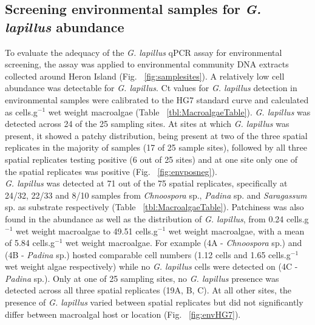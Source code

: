 \documentclass[10pt,letterpaper]{article}
\begin{document}
\subsection*{Screening environmental samples for \emph{G. lapillus} abundance }
\FloatBarrier
To evaluate the adequacy of the \emph{G. lapillus} 
qPCR assay for environmental screening, the assay was applied to environmental community DNA extracts collected around Heron Island (Fig. ~\ref{fig:samplesites}). 
A relatively low cell abundance was detectable for \emph{G. lapillus}. 
Ct values for \emph{G. lapillus} detection in environmental samples were calibrated to the HG7 standard curve and calculated as cells.g$^{-1}$ wet weight macroalgae (Table ~\ref{tbl:MacroalgaeTable}).  
\emph{G. lapillus} was detected across 24 of the 25 sampling sites. 
At sites at which \textit{G. lapillus} was present, it showed a patchy distribution, being present at two of the three spatial replicates in the majority of samples (17 of 25 sample sites), followed by all three spatial replicates testing positive (6 out of 25 sites) and at one site only one of the spatial replicates was positive (Fig. ~\ref{fig:envposneg}). \\
\emph{G. lapillus} was detected at 71 out of the 75 spatial replicates, specifically at 24/32, 22/33 and 8/10 samples from \emph{Chnoospora} sp., \emph{Padina} sp. and \emph{Saragassum} sp. as substrate respectively (Table ~\ref{tbl:MacroalgaeTable}).
Patchiness was also found in the abundance as well as the distribution of \emph{G. lapillus}, from 0.24 cells.g$^{-1}$ wet weight macroalgae to 49.51 cells.g$^{-1}$ wet weight macroalgae, with a mean of 5.84 cells.g$^{-1}$ wet weight macroalgae. 
For example (4A - \emph{Chnoospora} sp.) and (4B - \emph{Padina} sp.) hosted comparable cell numbers (1.12 cells and 1.65 cells.g$^{-1}$ wet weight algae respectively) while no \emph{G. lapillus} cells were detected on (4C - \emph{Padina} sp.).
Only at one of 25 sampling sites, no \emph{G. lapillus} presence was detected across all three spatial replicates (19A, B, C).
At all other sites, the presence of \textit{G. lapillus} varied between spatial replicates but did not significantly differ between macroalgal host or location (Fig. ~\ref{fig:envHG7}). 
\end{document}
